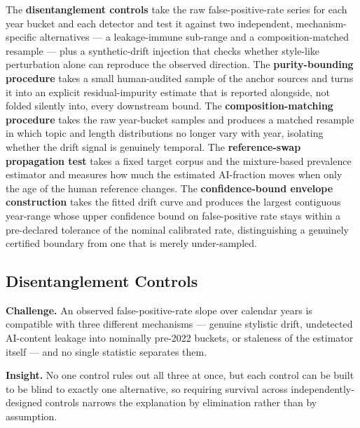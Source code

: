 \documentclass[conference]{IEEEtran}
\begin{document}
The \textbf{disentanglement controls} take the raw false-positive-rate series for each year bucket and each detector and test it against two independent, mechanism-specific alternatives --- a leakage-immune sub-range and a composition-matched resample --- plus a synthetic-drift injection that checks whether style-like perturbation alone can reproduce the observed direction. The \textbf{purity-bounding procedure} takes a small human-audited sample of the anchor sources and turns it into an explicit residual-impurity estimate that is reported alongside, not folded silently into, every downstream bound. The \textbf{composition-matching procedure} takes the raw year-bucket samples and produces a matched resample in which topic and length distributions no longer vary with year, isolating whether the drift signal is genuinely temporal. The \textbf{reference-swap propagation test} takes a fixed target corpus and the mixture-based prevalence estimator and measures how much the estimated AI-fraction moves when only the age of the human reference changes. The \textbf{confidence-bound envelope construction} takes the fitted drift curve and produces the largest contiguous year-range whose upper confidence bound on false-positive rate stays within a pre-declared tolerance of the nominal calibrated rate, distinguishing a genuinely certified boundary from one that is merely under-sampled.

\subsection{Disentanglement Controls}

\textbf{Challenge.} An observed false-positive-rate slope over calendar years is compatible with three different mechanisms --- genuine stylistic drift, undetected AI-content leakage into nominally pre-2022 buckets, or staleness of the estimator itself --- and no single statistic separates them.

\textbf{Insight.} No one control rules out all three at once, but each control can be built to be blind to exactly one alternative, so requiring survival across independently-designed controls narrows the explanation by elimination rather than by assumption.
\end{document}
